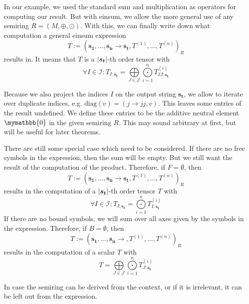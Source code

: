\begin{definition}
    In our example, we used the standard sum and multiplication as operators for computing our result.
    But with einsum, we allow the more general use of any semiring $R = (M, \oplus, \odot)$.
    With this, we can finally write down what computation a general einsum expression
    $$T := (\bm{s_1},\dots,\bm{s_n} \rightarrow \bm{s_t}, T^{(1)},\dots,T^{(n)})_R$$
    results in. It means that $T$ is a $\left| \bm{s_t} \right|$-th order tensor with
    $$\forall I \in \mathcal{I}: T_{I: \bm{s_t}} = \bigoplus\limits_{J \in \mathcal{J}} \bigodot\limits_{i = 1}^{n} T^{(i)}_{IJ:\bm{s_t}}$$

    Because we also project the indices $I$ on the output string $\bm{s_t}$, we allow to iterate over duplicate indices,
    e.g. $\text{diag}(v) = (j \rightarrow jj, v)$.
    This leaves some entries of the result undefined.
    We define these entries to be the additive neutral element $\mymathbb{0}$ in the given semiring $R$.
    This may sound arbitrary at first, but will be useful for later theorems.

    There are still some special case which need to be considered.
    If there are no free symbols in the expression, then the sum will be empty.
    But we still want the result of the computation of the product.
    Therefore, if $F = \emptyset$, then
    $$T := (\bm{s_1},\dots,\bm{s_n} \rightarrow \bm{s_t}, T^{(1)},\dots,T^{(n)})_R$$
    results in the computation of a $\left| \bm{s_t} \right|$-th order tensor $T$ with
    $$\forall I \in \mathcal{I}: T_{I: \bm{s_t}} = \bigodot\limits_{i = 1}^{n} T^{(i)}_{I:\bm{s_t}}$$
    If there are no bound symbols, we will sum over all axes given by the symbols in the expression.
    Therefore, if $B = \emptyset$, then
    $$T := (\bm{s_1},\dots,\bm{s_n} \rightarrow , T^{(1)},\dots,T^{(n)})_R$$
    results in the computation of a scalar $T$ with
    $$T = \bigoplus\limits_{J \in \mathcal{J}} \bigodot\limits_{i = 1}^{n} T^{(i)}_{J:\bm{s_t}}$$

    In case the semiring can be derived from the context, or if it is irrelevant, it can be left out from the expression.
\end{definition}

